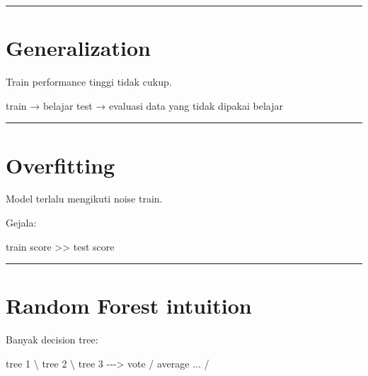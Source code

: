 \documentclass[
  indonesian,
  letterpaper,
  DIV=11,
  numbers=noendperiod]{scrreprt}
\newenvironment{Shaded}{\begin{snugshade}}{\end{snugshade}}
\newcommand{\NormalTok}[1]{\textcolor[rgb]{0.00,0.23,0.31}{#1}}
\begin{document}
\begin{center}\rule{0.5\linewidth}{0.5pt}\end{center}

\section{Generalization}\label{generalization}

Train performance tinggi tidak cukup.

\begin{Shaded}
\begin{Highlighting}[]
\NormalTok{train → belajar}
\NormalTok{test  → evaluasi data yang tidak dipakai belajar}
\end{Highlighting}
\end{Shaded}

\begin{center}\rule{0.5\linewidth}{0.5pt}\end{center}

\section{Overfitting}\label{overfitting}

Model terlalu mengikuti noise train.

Gejala:

\begin{Shaded}
\begin{Highlighting}[]
\NormalTok{train score \textgreater{}\textgreater{} test score}
\end{Highlighting}
\end{Shaded}

\begin{center}\rule{0.5\linewidth}{0.5pt}\end{center}

\section{Random Forest intuition}\label{random-forest-intuition}

Banyak decision tree:

\begin{Shaded}
\begin{Highlighting}[]
\NormalTok{tree 1 \textbackslash{}}
\NormalTok{tree 2  \textbackslash{}}
\NormalTok{tree 3 {-}{-}{-}\textgreater{} vote / average}
\NormalTok{...     /}
\end{Highlighting}
\end{Shaded}
\end{document}
